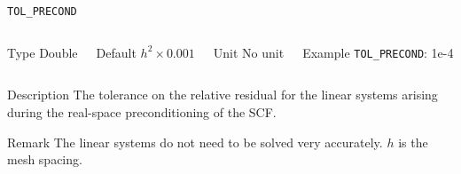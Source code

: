 \documentclass[xcolor=dvipsnames,t]{beamer}
\begin{document}
\begin{frame}[allowframebreaks]{\texttt{TOL\_PRECOND}} \label{TOL_PRECOND}
\vspace*{-12pt}
\begin{columns}
\begin{block}{Type}
Double
\end{block}

\begin{block}{Default}
$h^2\times0.001$
\end{block}

\begin{block}{Unit}
No unit
\end{block}

\begin{block}{Example}
\texttt{TOL\_PRECOND}: 1e-4
\end{block}
\end{columns}

\begin{block}{Description}
The tolerance on the relative residual for the linear systems arising during the real-space preconditioning of the SCF.
\end{block}

\begin{block}{Remark}
The linear systems do not need to be solved very accurately. $h$ is the mesh spacing.
\end{block}

\end{frame}
\end{document}
